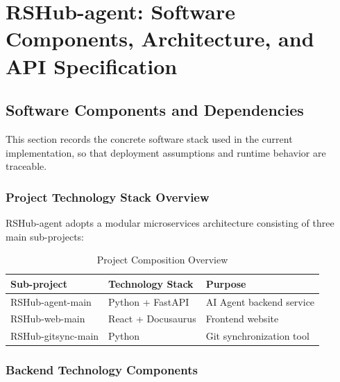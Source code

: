 \chapter{RSHub-agent: Software Components, Architecture, and API Specification}

\section{Software Components and Dependencies}
This section records the concrete software stack used in the current implementation, so that deployment assumptions and runtime behavior are traceable.

\subsection{Project Technology Stack Overview}

RSHub-agent adopts a modular microservices architecture consisting of three main sub-projects:

\begin{table}[H]
	\centering
	\caption{Project Composition Overview}
	\begin{tabular}{@{}lll@{}}
		\toprule
		\textbf{Sub-project} & \textbf{Technology Stack} & \textbf{Purpose} \\
		\midrule
		RSHub-agent-main & Python + FastAPI & AI Agent backend service \\
		RSHub-web-main & React + Docusaurus & Frontend website \\
		RSHub-gitsync-main & Python & Git synchronization tool \\
		\bottomrule
	\end{tabular}
\end{table}

\subsection{Backend Technology Components}

